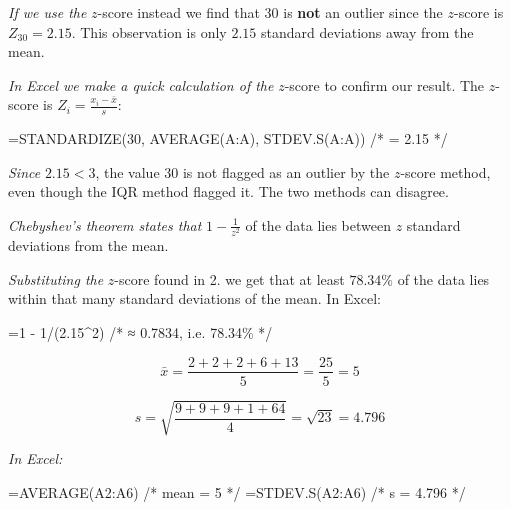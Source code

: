 \documentclass[
  11pt,
  letterpaper,
  DIV=11,
  numbers=noendperiod,
  oneside,
  open=any]{scrreprt}
\newenvironment{Shaded}{\begin{snugshade}}{\end{snugshade}}
\newcommand{\NormalTok}[1]{\textcolor[rgb]{0.00,0.23,0.31}{#1}}
\newenvironment{bsanswerkey}[2]{%
  \begin{tcolorbox}[bsbase, colback=bspaper2, colframe=bsline, fontupper=\small,
    title={\hypertarget{a-#1}{}\label{a-#1}\hyperlink{q-#1}{\textcolor{bsink2}{\MakeUppercase{#2}}}\hfill
      \hyperlink{q-#1}{\textcolor{bsaccent}{\normalfont\footnotesize back to page \pageref{q-#1}}}}]}%
  {\end{tcolorbox}}
\begin{document}
\begin{bsanswerkey}{bsans44}{Exercise 1, question 2}

\emph{If we use the} \(z\)-score instead we find that \(30\) is
\textbf{not} an outlier since the \(z\)-score is \(Z_{30}=2.15\). This
observation is only \(2.15\) standard deviations away from the mean.

\emph{In Excel we make a quick calculation of the} \(z\)-score to
confirm our result. The \(z\)-score is
\(Z_{i}=\frac{x_{i}-\bar{x}}{s}\):

\begin{Shaded}
\begin{Highlighting}[]
\NormalTok{=STANDARDIZE(30, AVERAGE(A:A), STDEV.S(A:A))   /* = 2.15 */}
\end{Highlighting}
\end{Shaded}

\emph{Since} \(2.15 < 3\), the value \(30\) is not flagged as an outlier
by the \(z\)-score method, even though the IQR method flagged it. The
two methods can disagree.

\end{bsanswerkey}

\begin{bsanswerkey}{bsans45}{Exercise 1, question 3}

\emph{Chebyshev's theorem states that} \(1-\frac{1}{z^{2}}\) of the data
lies between \(z\) standard deviations from the mean.

\emph{Substituting the} \(z\)-score found in 2. we get that at least
\(78.34\%\) of the data lies within that many standard deviations of the
mean. In Excel:

\begin{Shaded}
\begin{Highlighting}[]
\NormalTok{=1 {-} 1/(2.15\^{}2)    /* ≈ 0.7834, i.e. 78.34\% */}
\end{Highlighting}
\end{Shaded}

\end{bsanswerkey}

\begin{bsanswerkey}{bsans46}{Exercise 2, question 1}

\[\bar{x} = \frac{2+2+2+6+13}{5} = \frac{25}{5} = 5\]

\[s = \sqrt{\frac{9+9+9+1+64}{4}} = \sqrt{23} = 4.796\]

\emph{In Excel:}

\begin{Shaded}
\begin{Highlighting}[]
\NormalTok{=AVERAGE(A2:A6)    /* mean = 5      */}
\NormalTok{=STDEV.S(A2:A6)    /* s    = 4.796  */}
\end{Highlighting}
\end{Shaded}

\end{bsanswerkey}
\end{document}
